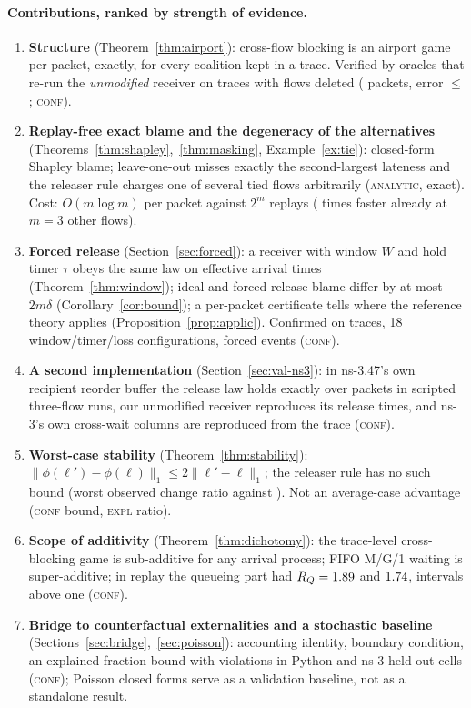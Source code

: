 \documentclass[11pt]{article}
\newcommand{\tagC}{\textsc{conf}}
\newcommand{\tagE}{\textsc{expl}}
\newcommand{\tagA}{\textsc{analytic}}
\theoremstyle{definition}
\begin{document}
\paragraph{Contributions, ranked by strength of evidence.}
\begin{enumerate}
  \item \textbf{Structure} (Theorem~\ref{thm:airport}): cross-flow blocking is an airport game per packet, exactly, for every coalition kept in a trace. Verified by oracles that re-run the \emph{unmodified} receiver on traces with flows deleted (\FvODoublePackets{} packets, error $\le$ \FvMaxErr{}; \tagC{}).
  \item \textbf{Replay-free exact blame and the degeneracy of the alternatives} (Theorems~\ref{thm:shapley},~\ref{thm:masking}, Example~\ref{ex:tie}): closed-form Shapley blame; leave-one-out misses exactly the second-largest lateness and the releaser rule charges one of several tied flows arbitrarily (\tagA{}, exact). Cost: $O(m\log m)$ per packet against $2^{m}$ replays (\FvCostRatio{} times faster already at $m=3$ other flows).
  \item \textbf{Forced release} (Section~\ref{sec:forced}): a receiver with window $W$ and hold timer $\tau$ obeys the same law on effective arrival times (Theorem~\ref{thm:window}); ideal and forced-release blame differ by at most $2m\delta$ (Corollary~\ref{cor:bound}); a per-packet certificate tells where the reference theory applies (Proposition~\ref{prop:applic}). Confirmed on \FvSxTraces{} traces, 18 window/timer/loss configurations, \FvSxEvents{} forced events (\tagC{}).
  \item \textbf{A second implementation} (Section~\ref{sec:val-ns3}): in ns-3.47's own recipient reorder buffer the release law holds exactly over \FvNsSixPackets{} packets in \FvNsSixRuns{} scripted three-flow runs, our unmodified receiver reproduces its release times, and ns-3's own cross-wait columns are reproduced from the trace (\tagC{}).
  \item \textbf{Worst-case stability} (Theorem~\ref{thm:stability}): $\|\phi(\ell')-\phi(\ell)\|_1\le2\|\ell'-\ell\|_1$; the releaser rule has no such bound (worst observed change ratio \FvRatioSh{} against \FvRatioRel{}). Not an average-case advantage (\tagC{} bound, \tagE{} ratio).
  \item \textbf{Scope of additivity} (Theorem~\ref{thm:dichotomy}): the trace-level cross-blocking game is sub-additive for any arrival process; FIFO M/G/1 waiting is super-additive; in replay the queueing part had $R_Q=1.89{}$ and $1.74{}$, intervals above one (\tagC{}).
  \item \textbf{Bridge to counterfactual externalities and a stochastic baseline} (Sections~\ref{sec:bridge},~\ref{sec:poisson}): accounting identity, boundary condition, an explained-fraction bound with violations in \FourPyViol{} Python and \FourNsViol{} ns-3 held-out cells (\tagC{}); Poisson closed forms serve as a validation baseline, not as a standalone result.
\end{enumerate}
\end{document}
